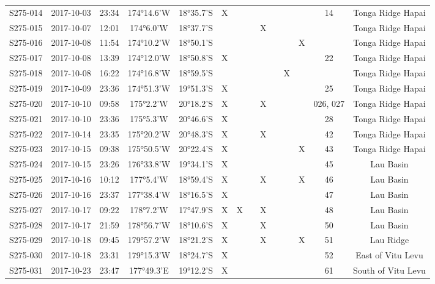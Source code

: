 \begin{longtable}{cccccccccccccc}
  S275-014 & 2017-10-03 & 23:34 & 174°14.6'W & 18°35.7'S & X &  &  &  &  &  &  & 14 & Tonga Ridge Hapai \\ 
  S275-015 & 2017-10-07 & 12:01 & 174°6.0'W & 18°37.7'S &  &  &  & X &  &  &  &  & Tonga Ridge Hapai \\ 
  S275-016 & 2017-10-08 & 11:54 & 174°10.2'W & 18°50.1'S &  &  &  &  &  &  & X &  & Tonga Ridge Hapai \\ 
  S275-017 & 2017-10-08 & 13:39 & 174°12.0'W & 18°50.8'S & X &  &  &  &  &  &  & 22 & Tonga Ridge Hapai \\ 
  S275-018 & 2017-10-08 & 16:22 & 174°16.8'W & 18°59.5'S &  &  &  &  &  & X &  &  & Tonga Ridge Hapai \\ 
  S275-019 & 2017-10-09 & 23:36 & 174°51.3'W & 19°51.3'S & X &  &  &  &  &  &  & 25 & Tonga Ridge Hapai \\ 
  S275-020 & 2017-10-10 & 09:58 & 175°2.2'W & 20°18.2'S & X &  &  & X &  &  &  & 026, 027 & Tonga Ridge Hapai \\ 
  S275-021 & 2017-10-10 & 23:36 & 175°5.3'W & 20°46.6'S & X &  &  &  &  &  &  & 28 & Tonga Ridge Hapai \\ 
  S275-022 & 2017-10-14 & 23:35 & 175°20.2'W & 20°48.3'S & X &  &  & X &  &  &  & 42 & Tonga Ridge Hapai \\ 
  S275-023 & 2017-10-15 & 09:38 & 175°50.5'W & 20°22.4'S & X &  &  &  &  &  & X & 43 & Tonga Ridge Hapai \\ 
  S275-024 & 2017-10-15 & 23:26 & 176°33.8'W & 19°34.1'S & X &  &  &  &  &  &  & 45 & Lau Basin \\ 
  S275-025 & 2017-10-16 & 10:12 & 177°5.4'W & 18°59.4'S & X &  &  & X &  &  & X & 46 & Lau Basin \\ 
  S275-026 & 2017-10-16 & 23:37 & 177°38.4'W & 18°16.5'S & X &  &  &  &  &  &  & 47 & Lau Basin \\ 
  S275-027 & 2017-10-17 & 09:22 & 178°7.2'W & 17°47.9'S & X & X &  & X &  &  &  & 48 & Lau Basin \\ 
  S275-028 & 2017-10-17 & 21:59 & 178°56.7'W & 18°10.6'S & X &  &  & X &  &  &  & 50 & Lau Basin \\ 
  S275-029 & 2017-10-18 & 09:45 & 179°57.2'W & 18°21.2'S & X &  &  & X &  &  & X & 51 & Lau Ridge \\ 
  S275-030 & 2017-10-18 & 23:31 & 179°15.3'W & 18°24.7'S & X &  &  &  &  &  &  & 52 & East of Vitu Levu \\ 
  S275-031 & 2017-10-23 & 23:47 & 177°49.3'E & 19°12.2'S & X &  &  &  &  &  &  & 61 & South of Vitu Levu \\ 

\end{longtable}
